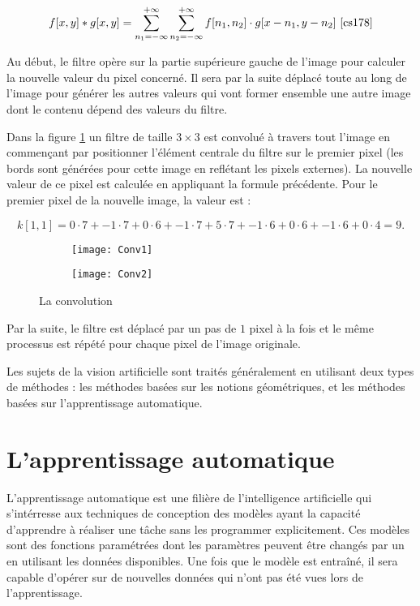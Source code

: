 $$
f[x,y] * g[x,y] = \sum_{n_1=-\infty}^{+\infty} \sum_{n_2=-\infty}^{+\infty} f[n_1,n_2] \cdot g[x-n_1, y-n_2]~\cite{cs178}
$$

Au début, le filtre opère sur la partie supérieure gauche de l'image pour
calculer la nouvelle valeur du pixel concerné. Il sera
par la suite déplacé toute au long de l'image pour générer les autres valeurs
qui vont former ensemble une autre image dont le contenu dépend des valeurs du
filtre.

Dans la figure \ref{fig:convolution} un filtre de taille $3 \times 3$ est convolué
à travers tout l'image en commençant par positionner l'élément centrale du filtre
sur le premier pixel (les bords sont générées pour cette image en reflétant les
pixels externes). La nouvelle valeur de ce pixel est calculée en appliquant la
formule précédente. Pour le premier pixel de la nouvelle image, la valeur est :

$$
k[1,1] = 0 \cdot 7 + -1 \cdot 7 + 0 \cdot 6 + -1 \cdot 7 + 5 \cdot 7 + -1 \cdot 6 + 0 \cdot 6 + -1 \cdot 6 + 0 \cdot 4 = 9.
$$

\begin{figure}[H]
\centering
\begin{subfigure}{0.45\textwidth}
\texttt{[image: Conv1]}
\end{subfigure}
\begin{subfigure}{0.45\textwidth}
\texttt{[image: Conv2]}
\end{subfigure}
\caption{La convolution\label{fig:convolution}}{\cite{commonsConvolution}}
\end{figure}

Par la suite, le filtre est déplacé par un pas de $1$ pixel à la fois et le même
processus est répété pour chaque pixel de l'image originale.

Les sujets de la vision artificielle sont traités généralement en utilisant deux
types de méthodes : les méthodes basées sur les notions géométriques,
et les méthodes basées sur l'apprentissage automatique.

\section{L'apprentissage automatique}

L'apprentissage automatique est une filière de
l'intelligence artificielle qui s'intérresse aux techniques de conception des
modèles ayant la capacité d'apprendre à réaliser une tâche sans les programmer
explicitement. Ces modèles sont des fonctions paramétrées dont les paramètres
peuvent être changés par un  en utilisant les données
disponibles. Une fois que le modèle est entraîné, il sera capable d'opérer sur
de nouvelles données qui n'ont pas été vues lors de l'apprentissage.

